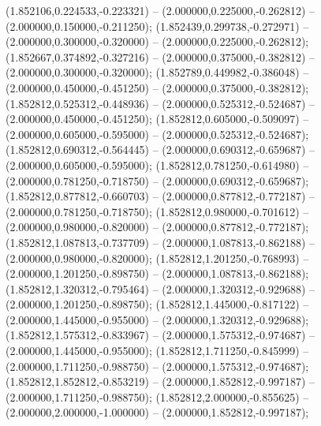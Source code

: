  (1.852106,0.224533,-0.223321) -- (2.000000,0.225000,-0.262812) -- (2.000000,0.150000,-0.211250);
 (1.852439,0.299738,-0.272971) -- (2.000000,0.300000,-0.320000) -- (2.000000,0.225000,-0.262812);
 (1.852667,0.374892,-0.327216) -- (2.000000,0.375000,-0.382812) -- (2.000000,0.300000,-0.320000);
 (1.852789,0.449982,-0.386048) -- (2.000000,0.450000,-0.451250) -- (2.000000,0.375000,-0.382812);
 (1.852812,0.525312,-0.448936) -- (2.000000,0.525312,-0.524687) -- (2.000000,0.450000,-0.451250);
 (1.852812,0.605000,-0.509097) -- (2.000000,0.605000,-0.595000) -- (2.000000,0.525312,-0.524687);
 (1.852812,0.690312,-0.564445) -- (2.000000,0.690312,-0.659687) -- (2.000000,0.605000,-0.595000);
 (1.852812,0.781250,-0.614980) -- (2.000000,0.781250,-0.718750) -- (2.000000,0.690312,-0.659687);
 (1.852812,0.877812,-0.660703) -- (2.000000,0.877812,-0.772187) -- (2.000000,0.781250,-0.718750);
 (1.852812,0.980000,-0.701612) -- (2.000000,0.980000,-0.820000) -- (2.000000,0.877812,-0.772187);
 (1.852812,1.087813,-0.737709) -- (2.000000,1.087813,-0.862188) -- (2.000000,0.980000,-0.820000);
 (1.852812,1.201250,-0.768993) -- (2.000000,1.201250,-0.898750) -- (2.000000,1.087813,-0.862188);
 (1.852812,1.320312,-0.795464) -- (2.000000,1.320312,-0.929688) -- (2.000000,1.201250,-0.898750);
 (1.852812,1.445000,-0.817122) -- (2.000000,1.445000,-0.955000) -- (2.000000,1.320312,-0.929688);
 (1.852812,1.575312,-0.833967) -- (2.000000,1.575312,-0.974687) -- (2.000000,1.445000,-0.955000);
 (1.852812,1.711250,-0.845999) -- (2.000000,1.711250,-0.988750) -- (2.000000,1.575312,-0.974687);
 (1.852812,1.852812,-0.853219) -- (2.000000,1.852812,-0.997187) -- (2.000000,1.711250,-0.988750);
 (1.852812,2.000000,-0.855625) -- (2.000000,2.000000,-1.000000) -- (2.000000,1.852812,-0.997187);
